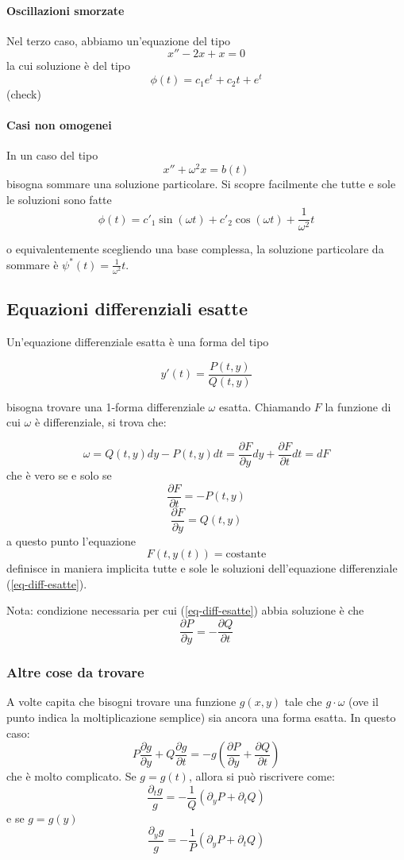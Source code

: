 \documentclass[a4paper,12pt]{article}
\begin{document}
\paragraph{Oscillazioni smorzate}
Nel terzo caso, abbiamo un'equazione del tipo
$$x''-2x +x=0$$
la cui soluzione è del tipo
$$\phi(t) = c_1e^t +c_2 t + e^t$$
(check)

\paragraph{Casi non omogenei}
In un caso del tipo
$$x''+\omega^2 x=b(t)$$
bisogna sommare una soluzione particolare. Si scopre facilmente che tutte e sole le soluzioni sono fatte
$$\phi(t) = c'_1\sin(\omega t) + c'_2\cos(\omega t) + \frac{1}{\omega^2}t$$

o equivalentemente scegliendo una base complessa, la soluzione particolare da sommare è $\psi^*(t) = \frac{1}{\omega^2}t$.

\subsection{Equazioni differenziali esatte}

Un'equazione differenziale esatta è una forma del tipo

\begin{equation}\label{eq-diff-esatte}
y'(t)=\frac{P(t, y)}{Q(t,y)} 
\end{equation}

bisogna trovare una 1-forma differenziale $\omega$ esatta. Chiamando $F$ la funzione di cui $\omega$ è differenziale, si trova che:

$$\omega = Q(t,y)dy - P(t,y)dt = \frac{\partial F}{\partial y}dy+\frac{\partial F}{\partial t}dt = dF$$
che è vero se e solo se
$$\frac{\partial F}{\partial t}=-P(t,y)$$
$$\frac{\partial F}{\partial y}=Q(t,y)$$
a questo punto l'equazione
$$F(t, y(t)) = \text{costante}$$
definisce in maniera implicita tutte e sole le soluzioni dell'equazione differenziale (\ref{eq-diff-esatte}).

Nota: condizione necessaria per cui (\ref{eq-diff-esatte}) abbia soluzione è che
$$\frac{\partial P}{\partial y}=-\frac{\partial Q}{\partial t}$$

\subsubsection{Altre cose da trovare}
A volte capita che bisogni trovare una funzione $g(x,y)$ tale che $g\cdot\omega$ (ove il punto indica la moltiplicazione semplice) sia ancora una forma esatta. In questo caso:
$$P\frac{\partial g}{\partial y} + Q\frac{\partial g}{\partial t} = -g\left(\frac{\partial P}{\partial y} + \frac{\partial Q}{\partial t}\right)$$
che è molto complicato.
Se $g=g(t)$, allora si può riscrivere come:
$$\frac{\partial_tg}{g} = -\frac{1}{Q}(\partial_yP+\partial_tQ)$$
e se $g=g(y)$
$$\frac{\partial_yg}{g} = -\frac{1}{P}(\partial_yP+\partial_tQ)$$
\end{document}
